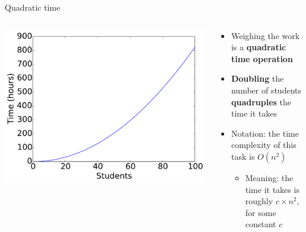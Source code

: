 \begin{frame}{Quadratic time}
	\begin{columns}
		\begin{column}{0.47\textwidth}
			\includegraphics[width=\textwidth]{plot_quadratic}
		\end{column}
		\begin{column}{0.47\textwidth}
			\begin{itemize}
				\item Weighing the work is a \textbf{quadratic time operation} \pause
				\item \textbf{Doubling} the number of students \textbf{quadruples} the time it takes \pause
				\item Notation: the time complexity of this task is $O(n^2)$ \pause
				\begin{itemize}
					\item Meaning: the time it takes is roughly $c \times n^2$, for some constant $c$
				\end{itemize}
			\end{itemize}
		\end{column}
	\end{columns}
\end{frame}

